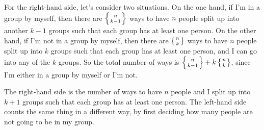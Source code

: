 {\begin{solution}
{\begin{storyproof}
                For the right-hand side, let's consider two situations. 
                On the one hand, if I'm in a group by myself, then there are $\left\{{n \atop k-1}\right\}$ ways to have $n$ people split up into another $k-1$ groups such that each group has at least one person. 
                On the other hand, if I'm not in a group by myself, then there are $\left\{{n \atop k}\right\}$ ways to have $n$ people split up into $k$ groups such that each group has at least one person, and I can go into any of the $k$ groups. 
                So the total number of ways is $\left\{{n \atop k-1}\right\} + k \left\{{n \atop k}\right\}$, since I'm either in a group by myself or I'm not. 
            \end{storyproof}
            \item 
            \begin{storyproof}
                The right-hand side is the number of ways to have $n$ people and I split up into $k+1$ groups such that each group has at least one person. 
                The left-hand side counts the same thing in a different way, by first deciding how many people are not going to be in my group. 


\end{storyproof}}
\end{solution}}
